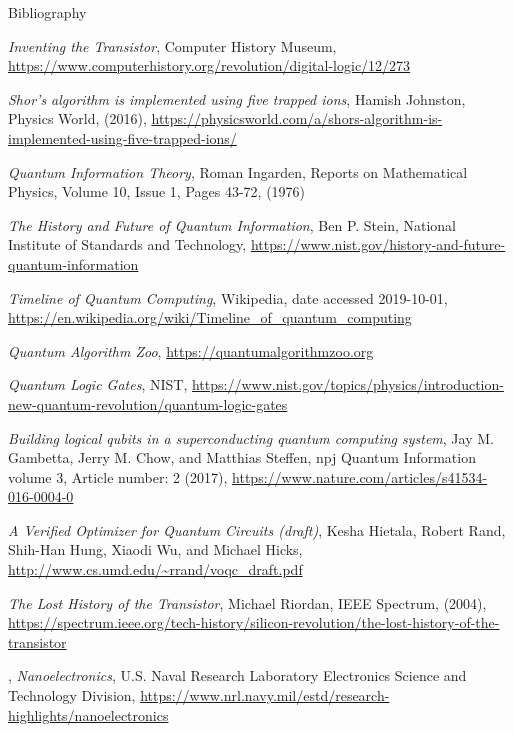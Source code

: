 \begin{frame}[allowframebreaks]{Bibliography}
\begin{thebibliography}{99}
    \emph{Inventing the Transistor}, %
    Computer History Museum, %
    \url{https://www.computerhistory.org/revolution/digital-logic/12/273}

    \emph{Shor’s algorithm is implemented using five trapped ions}, %
    Hamish Johnston, Physics World, (2016), %
    \url{https://physicsworld.com/a/shors-algorithm-is-implemented-using-five-trapped-ions/}

    \emph{Quantum Information Theory}, %
    Roman Ingarden, %
    Reports on Mathematical Physics, %
    Volume 10, Issue 1, Pages 43-72, (1976)

    \emph{The History and Future of Quantum Information}, %
    Ben P. Stein, National Institute of Standards and Technology, %
    \url{https://www.nist.gov/history-and-future-quantum-information}

    \emph{Timeline of Quantum Computing}, %
    Wikipedia, date accessed 2019-10-01, %
    \url{https://en.wikipedia.org/wiki/Timeline_of_quantum_computing}

    \emph{Quantum Algorithm Zoo}, %
    \url{https://quantumalgorithmzoo.org}

    \emph{Quantum Logic Gates}, %
    NIST, %
    \url{https://www.nist.gov/topics/physics/introduction-new-quantum-revolution/quantum-logic-gates}

    \emph{Building logical qubits in a superconducting quantum computing
      system}, %
    Jay M. Gambetta, Jerry M. Chow, and Matthias Steffen, %
    npj Quantum Information volume 3, Article number: 2 (2017), %
    \url{https://www.nature.com/articles/s41534-016-0004-0}

    \emph{A Verified Optimizer for Quantum Circuits (draft)}, %
    Kesha Hietala, Robert Rand, Shih-Han Hung, Xiaodi Wu, and Michael
    Hicks, %
    \url{http://www.cs.umd.edu/~rrand/voqc_draft.pdf}

    \emph{The Lost History of the Transistor}, %
    Michael Riordan, IEEE Spectrum, (2004), %
    \url{https://spectrum.ieee.org/tech-history/silicon-revolution/the-lost-history-of-the-transistor}

  , %
    \emph{Nanoelectronics}, %
    U.S. Naval Research Laboratory Electronics Science and Technology
    Division, %
    \url{https://www.nrl.navy.mil/estd/research-highlights/nanoelectronics}
    

\end{thebibliography}
\end{frame}
